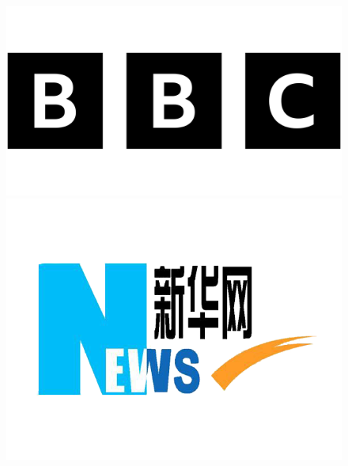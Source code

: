 

    \begin{figure}[ht]
        \centering
        \begin{minipage}[b]{0.06\linewidth}
            \includegraphics[width=\linewidth]{images/BBC-Logo.png}
        \end{minipage}
        \hfill
        \begin{minipage}[b]{0.06\linewidth}
            \includegraphics[width=\linewidth]{images/xinhua-logo-feature_0.png}

\end{minipage}
\end{figure}
